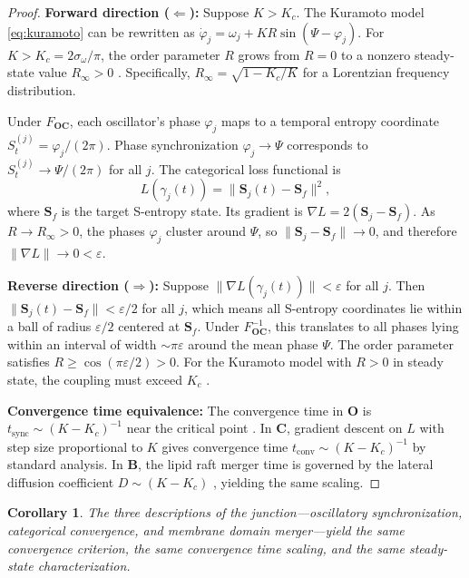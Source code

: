 \documentclass[twocolumn,10pt]{article}
\newtheorem{corollary}[theorem]{Corollary}
\theoremstyle{remark}
\newcommand{\St}{S_t}
\newcommand{\eps}{\varepsilon}
\newcommand{\Scoord}{\mathbf{S}}
\newcommand{\CatO}{\mathbf{O}}
\newcommand{\CatC}{\mathbf{C}}
\newcommand{\CatB}{\mathbf{B}}
\newcommand{\Foc}{F_{\CatO\CatC}}
\begin{document}
\begin{proof}
\textbf{Forward direction ($\Leftarrow$):}
Suppose $K > K_c$.
The Kuramoto model \eqref{eq:kuramoto} can be rewritten as $\dot{\varphi}_j = \omega_j + KR\sin(\Psi - \varphi_j)$.
For $K > K_c = 2\sigma_\omega/\pi$, the order parameter $R$ grows from $R = 0$ to a nonzero steady-state value $R_\infty > 0$ \cite{strogatz2000,kuramoto1984}.
Specifically, $R_\infty = \sqrt{1 - K_c/K}$ for a Lorentzian frequency distribution.

Under $\Foc$, each oscillator's phase $\varphi_j$ maps to a temporal entropy coordinate $\St^{(j)} = \varphi_j/(2\pi)$.
Phase synchronization $\varphi_j \to \Psi$ corresponds to $\St^{(j)} \to \Psi/(2\pi)$ for all $j$.
The categorical loss functional is
\begin{equation}
L(\gamma_j(t)) = \|\Scoord_j(t) - \Scoord_f\|^2,
\end{equation}
where $\Scoord_f$ is the target S-entropy state.
Its gradient is $\nabla L = 2(\Scoord_j - \Scoord_f)$.
As $R \to R_\infty > 0$, the phases $\varphi_j$ cluster around $\Psi$, so $\|\Scoord_j - \Scoord_f\| \to 0$, and therefore $\|\nabla L\| \to 0 < \eps$.

\textbf{Reverse direction ($\Rightarrow$):}
Suppose $\|\nabla L(\gamma_j(t))\| < \eps$ for all $j$.
Then $\|\Scoord_j(t) - \Scoord_f\| < \eps/2$ for all $j$, which means all S-entropy coordinates lie within a ball of radius $\eps/2$ centered at $\Scoord_f$.
Under $\Foc^{-1}$, this translates to all phases lying within an interval of width $\sim \pi\eps$ around the mean phase $\Psi$.
The order parameter satisfies $R \geq \cos(\pi\eps/2) > 0$.
For the Kuramoto model with $R > 0$ in steady state, the coupling must exceed $K_c$ \cite{strogatz2000}.

\textbf{Convergence time equivalence:}
The convergence time in $\CatO$ is $t_{\mathrm{sync}} \sim (K - K_c)^{-1}$ near the critical point \cite{strogatz2000}.
In $\CatC$, gradient descent on $L$ with step size proportional to $K$ gives convergence time $t_{\mathrm{conv}} \sim (K - K_c)^{-1}$ by standard analysis.
In $\CatB$, the lipid raft merger time is governed by the lateral diffusion coefficient $D \sim (K - K_c)$ \cite{lipowsky1995,simons1997}, yielding the same scaling.
\end{proof}

\begin{corollary}
The three descriptions of the junction---oscillatory synchronization, categorical convergence, and membrane domain merger---yield the same convergence criterion, the same convergence time scaling, and the same steady-state characterization.
\end{corollary}
\end{document}
